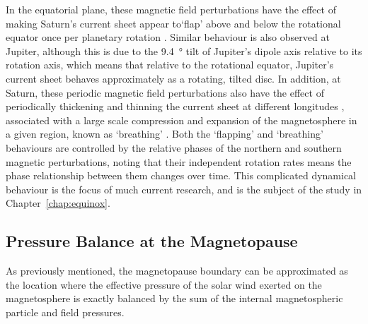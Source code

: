 {In the equatorial plane, these magnetic field perturbations have the effect of making Saturn's current sheet appear to`flap' above and below the rotational equator once per planetary rotation \citep[e.g.][]{arridge2011}. Similar behaviour is also observed at Jupiter, although this is due to the \SI{9.4}{\degree} tilt of Jupiter's dipole axis relative to its rotation axis, which means that relative to the rotational equator, Jupiter's current sheet behaves approximately as a rotating, tilted disc. In addition, at Saturn, these periodic magnetic field perturbations also have the effect of periodically thickening and thinning the current sheet at different longitudes \citep{provan2012}, associated with a large scale compression and expansion of the magnetosphere in a given region, known as `breathing' \citep{ramer2016}. Both the `flapping' and `breathing' behaviours are controlled by the relative phases of the northern and southern magnetic perturbations, noting that their independent rotation rates means the phase relationship between them changes over time. This complicated dynamical behaviour is the focus of much current research, and is the subject of the study in Chapter~\ref{chap:equinox}.

\subsection{Pressure Balance at the Magnetopause}\label{intro:sec:pbalance}
As previously mentioned, the magnetopause boundary can be approximated as the location where the effective pressure of the solar wind exerted on the magnetosphere is exactly balanced by the sum of the internal magnetospheric particle and field pressures. 

}
